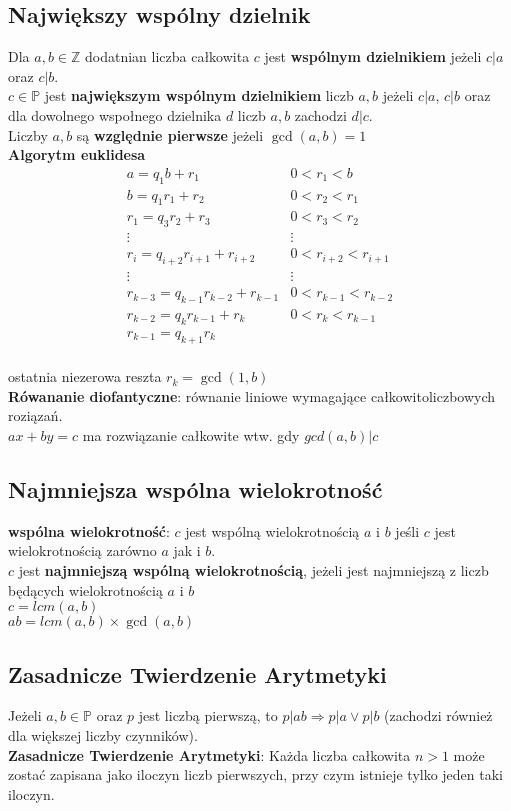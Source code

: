 \documentclass[a4paper,12pt]{article}
\begin{document}
\subsection{Największy wspólny dzielnik}
	Dla $a, b\in \mathbb{Z}$ dodatnian liczba całkowita $c$ jest \textbf{wspólnym dzielnikiem} jeżeli $c|a$ oraz $c|b$.\\
	$c\in\mathbb{P}$ jest \textbf{największym wspólnym dzielnikiem} liczb $a, b$ jeżeli $c|a$, $c|b$ oraz dla dowolnego wspołnego dzielnika $d$ liczb $a, b$ zachodzi $d|c$.\\
	Liczby $a,b$ są \textbf{względnie pierwsze} jeżeli $\gcd(a,b)=1$\\
	\textbf{Algorytm euklidesa}$$
	\begin{matrix}
		a=q_1b+r_1 &0<r_1<b\\
		b=q_1r_1+r_2 & 0<r_2<r_1\\
		r_1=q_3r_2+r_3 & 0<r_3<r_2\\
		\vdots & \vdots \\
		r_i=q_{i+2}r_{i+1}+r_{i+2} & 0<r_{i+2}<r_{i+1}\\
		\vdots & \vdots \\
		r_{k-3}=q_{k-1}r_{k-2}+r_{k-1} & 0<r_{k-1}<r_{k-2}\\
		r_{k-2}=q_{k}r_{k-1}+r_{k} & 0<r_{k}<r_{k-1}\\
		r_{k-1}=q_{k+1}r_k
	\end{matrix}$$\\
	ostatnia niezerowa reszta $r_k=\gcd(1,b)$\\
\textbf{Rówananie diofantyczne}: równanie liniowe wymagające całkowitoliczbowych roziązań.\\
$ax+by=c$ ma rozwiązanie całkowite wtw. gdy $gcd(a,b)|c$
\subsection{Najmniejsza wspólna wielokrotność}
\textbf{wspólna wielokrotność}: $c$ jest wspólną wielokrotnością $a$ i $b$ jeśli $c$ jest wielokrotnością zarówno $a$ jak i $b$.\\
$c$ jest \textbf{najmniejszą wspólną wielokrotnością}, jeżeli jest najmniejszą z liczb będących wielokrotnością $a$ i $b$\\
$c=lcm(a,b)$ \\
$ab=lcm(a,b)\times\gcd(a,b)$
\subsection{Zasadnicze Twierdzenie Arytmetyki}
Jeżeli $a,b\in\mathbb{P}$ oraz $p$ jest liczbą pierwszą, to $p|ab\Rightarrow p|a \vee p|b$ (zachodzi również dla większej liczby czynników).\\
\textbf{Zasadnicze Twierdzenie Arytmetyki}: Każda liczba całkowita $n>1$ może zostać zapisana jako iloczyn liczb pierwszych, przy czym istnieje tylko jeden taki iloczyn.
\end{document}

